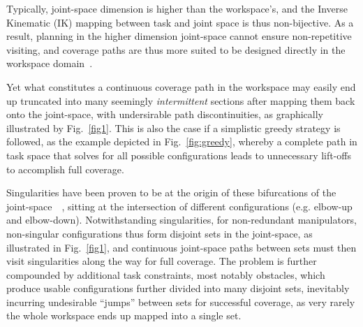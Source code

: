 \documentclass[journal]{IEEEtran}
\begin{document}
Typically, joint-space dimension is higher than the workspace's, %
and the Inverse Kinematic (IK) mapping between task and joint space is thus non-bijective.  
As a result, planning in the higher dimension joint-space cannot ensure non-repetitive visiting, 
and coverage paths are thus more suited to be designed directly in the workspace domain~\cite{Oriolo2005Motion}.  


Yet what constitutes a continuous coverage path in the workspace may easily end up truncated into many seemingly \textit{intermittent} sections after mapping them back onto the joint-space, with undersirable path discontinuities, as graphically illustrated by Fig.~\ref{fig1}. This is also the case if a simplistic greedy strategy is followed, as the example depicted in Fig.~\ref{fig:greedy}, whereby a complete path in task space that solves for all possible configurations leads to unnecessary lift-offs to accomplish full coverage. 

Singularities have been proven to be at the origin of these bifurcations of the joint-space~\cite{porta2010path}~\cite{Porta2012Randomized}, sitting at the intersection of different configurations (e.g. elbow-up and elbow-down).
Notwithstanding singularities, for non-redundant manipulators, non-singular configurations thus form disjoint sets in the joint-space, as illustrated in Fig.~\ref{fig1}, and continuous joint-space paths between sets must then visit singularities along the way for full coverage. The problem is further compounded by additional task constraints, most notably obstacles, which produce usable configurations further divided into many disjoint sets, inevitably incurring undesirable ``jumps'' between sets for successful coverage, as very rarely the whole workspace ends up mapped into a single set.  
\end{document}
